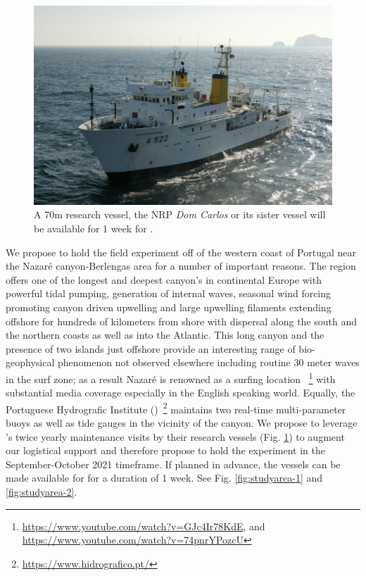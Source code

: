 \begin{figure}
  \vspace{-0.5cm}
  \centering
  \includegraphics[scale=2]{fig/dom-carlos.jpg}
  \caption{A 70m research vessel, the NRP \emph{Dom Carlos} or its
    sister vessel will be available for 1 week for \proje.}
  \vspace{-0.3cm}
 \label{fig:vessel}
\end{figure}


We propose to hold the field experiment off of the western coast of
Portugal near the Nazar\'e canyon-Berlengas area for a number of
important reasons. The region offers one of the longest and deepest
canyon's in continental Europe with powerful tidal pumping, generation
of internal waves, seasonal wind forcing promoting canyon driven
upwelling and large upwelling filaments extending offshore for
hundreds of kilometers from shore with dispersal along the south and
the northern coasts as well as into the Atlantic.  This long canyon
and the presence of two islands just offshore provide an interesting
range of bio-geophysical phenomenon not observed elsewhere including
routine 30 meter waves in the surf zone; as a result Nazar\'e is
renowned as a surfing location
~\footnote{\url{https://www.youtube.com/watch?v=GJc4Ir78KdE}, and
  \url{https://www.youtube.com/watch?v=74pnrYPozcU}} with substantial
media coverage especially in the English speaking world.  Equally, the
Portuguese Hydrografic Institute
(\inste)~\footnote{\url{https://www.hidrografico.pt/}} maintains two
real-time multi-parameter buoys as well as tide gauges in the vicinity
of the canyon. We propose to leverage \inste's twice yearly
maintenance visits by their research vessels (Fig. \ref{fig:vessel})
to augment our logistical support and therefore propose to hold the
experiment in the September-October 2021 timeframe. If planned in
advance, the vessels can be made available for \proj for a duration of
1 week. See Fig. \ref{fig:studyarea-1} and \ref{fig:studyarea-2}.

